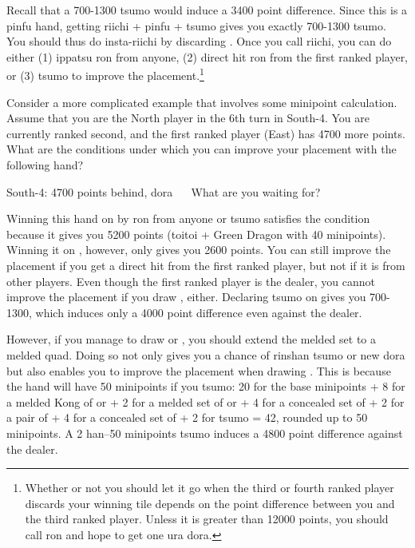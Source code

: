 \bigskip
Recall that a 700-1300 {\jap tsumo} would induce a 3400 point difference. Since this is a {\jap pinfu} hand, getting {\jap riichi + pinfu + tsumo} gives you exactly 700-1300 {\jap tsumo}. You should thus do insta-riichi by discarding {\LARGE{}}. Once you call riichi, you can do either (1) {\jap ippatsu ron} from anyone, (2) direct hit {\jap ron} from the first ranked player, or (3) {\jap tsumo} to improve the placement.\footnote{Whether or not you should let it go when the third or fourth ranked player discards your winning tile depends on the point difference between you and the third ranked player. Unless it is greater than 12000 points, you should call {\jap ron} and hope to get one {\jap ura dora}.}

\bigskip
Consider a more complicated example that involves some minipoint calculation. Assume that you are the North player in the 6th turn in South-4. You are currently ranked second, and the first ranked player (East) has 4700 more points. 
What are the conditions under which you can improve your placement with the following hand?

\bigskip
\begin{itembox}[r]{South-4: 4700 points behind, {\jap dora} {\LARGE{}}}
\bp
{}\fa\fa~~
\ep
\vspace{-10pt}
What are you waiting for?
\end{itembox}
\noindent Winning this hand on {\LARGE\fa} by {\jap ron} from anyone or {\jap tsumo} satisfies the condition because it gives you 5200 points ({\jap toitoi} + Green Dragon with 40 minipoints). Winning it on {\LARGE{}}, however, only gives you 2600 points. You can still improve the placement if you get a direct hit from the first ranked player, but not if it is from other players. Even though the first ranked player is the dealer, you cannot improve the placement if you draw {\LARGE{}}, either. Declaring {\jap tsumo} on {\LARGE{}} gives you 700-1300, which induces only a 4000 point difference even against the dealer. 

\bigskip
However, if you manage to draw {\LARGE{}} or {\LARGE{}}, you should extend the melded set to a melded quad. Doing so not only gives you a chance of {\jap rinshan tsumo} or new {\jap dora} but also enables you to improve the placement when drawing {\LARGE{}}. This is because the hand will have 50 minipoints if you {\jap tsumo}: 20 for the base minipoints + 8 for a melded Kong of {\LARGE{}} or {\LARGE{}} + 2 for a melded set of {\LARGE{}} or {\LARGE{}} + 4 for a concealed set of {\LARGE{}} + 2 for a pair of {\LARGE\fa} + 4 for a concealed set of {\LARGE{}} + 2 for {\jap tsumo} = 42, rounded up to 50 minipoints. A 2 {\jap han}--50 minipoints {\jap tsumo} induces a 4800 point difference against the dealer.

